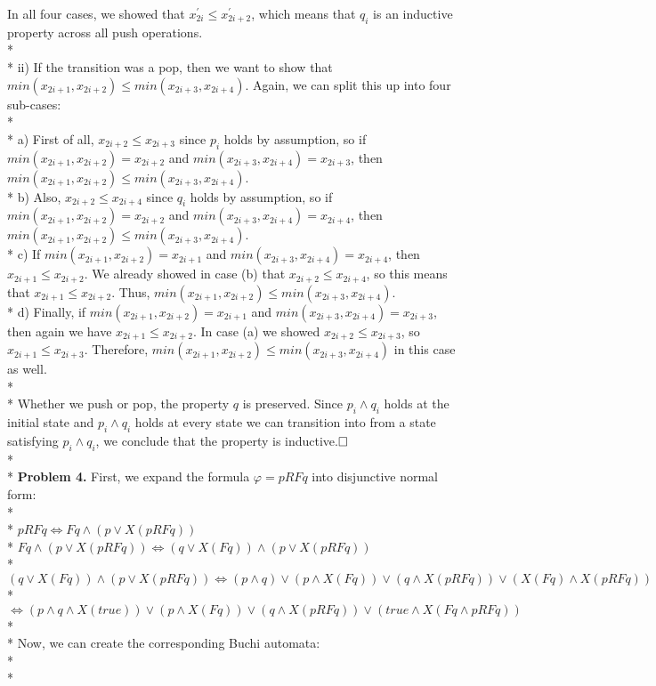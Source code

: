 \documentclass[12pt]{article}
\begin{document}
In all four cases, we showed that $x^\prime_{2i}\leq x^\prime_{2i+2}$, which means that $q_i$ is an inductive property across all push operations.\\*\\*
ii) If the transition was a pop, then we want to show that $min(x_{2i+1},x_{2i+2})\leq min(x_{2i+3},x_{2i+4})$. Again, we can split this up into four sub-cases:\\*\\*
a) First of all, $x_{2i+2}\leq x_{2i+3}$ since $p_i$ holds by assumption, so if $min(x_{2i+1},x_{2i+2})=x_{2i+2}$ and $min(x_{2i+3},x_{2i+4})=x_{2i+3}$, then $min(x_{2i+1},x_{2i+2})\leq min(x_{2i+3},x_{2i+4})$.\\*
b) Also, $x_{2i+2}\leq x_{2i+4}$ since $q_i$ holds by assumption, so if $min(x_{2i+1},x_{2i+2})=x_{2i+2}$ and $min(x_{2i+3},x_{2i+4})=x_{2i+4}$, then $min(x_{2i+1},x_{2i+2})\leq min(x_{2i+3},x_{2i+4})$.\\*
c) If $min(x_{2i+1},x_{2i+2})=x_{2i+1}$ and $min(x_{2i+3},x_{2i+4})=x_{2i+4}$, then $x_{2i+1}\leq x_{2i+2}$. We already showed in case (b) that $x_{2i+2}\leq x_{2i+4}$, so this means that $x_{2i+1}\leq x_{2i+2}$. Thus, $min(x_{2i+1},x_{2i+2})\leq min(x_{2i+3},x_{2i+4})$.\\*
d) Finally, if $min(x_{2i+1},x_{2i+2})=x_{2i+1}$ and $min(x_{2i+3},x_{2i+4})=x_{2i+3}$, then again we have $x_{2i+1}\leq x_{2i+2}$. In case (a) we showed $x_{2i+2}\leq x_{2i+3}$, so $x_{2i+1}\leq x_{2i+3}$. Therefore, $min(x_{2i+1},x_{2i+2})\leq min(x_{2i+3},x_{2i+4})$ in this case as well.\\*\\*
Whether we push or pop, the property $q$ is preserved. Since $p_i\wedge q_i$ holds at the initial state and $p_i\wedge q_i$ holds at every state we can transition into from a state satisfying $p_i\wedge q_i$, we conclude that the property is inductive.$\hfill\Box$\\*\\*
\textbf{Problem 4.} First, we expand the formula $\varphi=pRFq$ into disjunctive normal form:\\*\\*
$pRFq\Longleftrightarrow Fq\wedge(p\vee X(pRFq))$\\*
$Fq\wedge(p\vee X(pRFq))\Longleftrightarrow(q\vee X(Fq))\wedge(p\vee X(pRFq))$\\*
$(q\vee X(Fq))\wedge(p\vee X(pRFq))\Longleftrightarrow(p\wedge q)\vee(p\wedge X(Fq))\vee(q\wedge X(pRFq))\vee(X(Fq)\wedge X(pRFq))$\\*
$\Longleftrightarrow(p\wedge q\wedge X(true))\vee(p\wedge X(Fq))\vee(q\wedge X(pRFq))\vee(true\wedge X(Fq\wedge pRFq))$\\*\\*
Now, we can create the corresponding Buchi automata:\\*\\*
\end{document}
